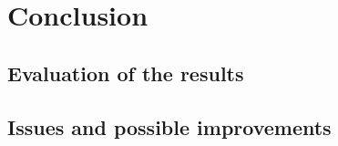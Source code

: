 \chapter{Conclusion}

\section{Evaluation of the results}


\section{Issues and possible improvements}

